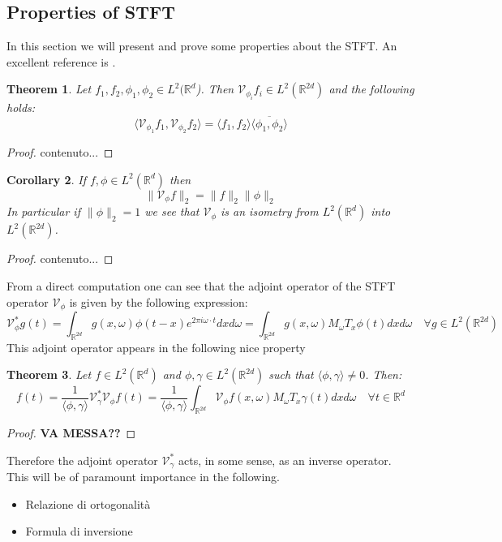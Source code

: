\documentclass[corpo=11pt, stile=classica, tipotesi=custom,
greek, evenboxes, english]{toptesi}
\numberwithin{equation}{chapter}
\newtheorem{teo}{Theorem}[chapter] %
\newtheorem{cor}[teo]{Corollary}
\newcommand{\R}{\mathbb{R}} %
\newcommand{\V}{\mathcal{V}} %
\begin{document}
\subsection{Properties of STFT}
In this section we will present and prove some properties about the STFT. An excellent reference is \cite{grochenig}.
\begin{teo}\label{orthogonality relations theorem}
	Let $f_1,f_2,\phi_1,\phi_2 \in L^2(\R^d$). Then $\V_{\phi_i}f_i \in L^2(\R^{2d})$ and the following holds:
	\begin{equation}\label{orthogonality relation formula}
		\langle \V_{\phi_1} f_1, \V_{\phi_2} f_2 \rangle = \langle f_1, f_2 \rangle \overline{\langle \phi_1, \phi_2 \rangle}
	\end{equation}
\end{teo}
\begin{proof}
	contenuto...
\end{proof}
\begin{cor}
	If $f, \phi \in L^2(\R^d)$ then
	\begin{equation*}
		\| \V_{\phi} f\|_2 = \| f \|_2 \| \phi \|_2
	\end{equation*} 
	In particular if $\| \phi \|_2 = 1$ we see that $\V_{\phi}$ is an isometry from $L^2(\R^d)$ into $L^2(\R^{2d})$.
\end{cor}
\begin{proof}
	contenuto...
\end{proof}
From a direct computation one can see that the adjoint operator of the STFT operator $\V_{\phi}$ is given by the following expression:
\begin{equation}\label{STFT adjoint}
	\V_{\phi}^* g(t) = \int_{\R^{2d}} g(x,\omega) \phi(t-x) e^{2 \pi i \omega \cdot t} dxd\omega = \int_{\R^{2d}} g(x,\omega) M_{\omega}T_x \phi (t) dxd\omega\quad \forall g \in L^2(\R^{2d})
\end{equation}
This adjoint operator appears in the following nice property
\begin{teo}\label{inversion formula theorem}
	Let $f \in L^2(\R^d)$ and $\phi, \gamma \in L^2(\R^{2d})$ such that $\langle \phi, \gamma \rangle \neq 0$. Then:
	\begin{equation}\label{inversion formula}
		f(t) = \dfrac{1}{\langle \phi, \gamma \rangle} \V_{\gamma}^* \V_{\phi} f(t) = \dfrac{1}{\langle \phi, \gamma \rangle} \int_{\R^{2d}} \V_{\phi}f(x,\omega)M_{\omega}T_x \gamma (t) dxd\omega \quad \forall t \in \R^d
	\end{equation}
\end{teo}
\begin{proof}
	\textbf{VA MESSA??}
\end{proof}
Therefore the adjoint operator $\V_{\gamma}^*$ acts, in some sense, as an inverse operator. This will be of paramount importance in the following.
\begin{itemize}
	\item Relazione di ortogonalità
	\item Formula di inversione
\end{itemize}
\end{document}
